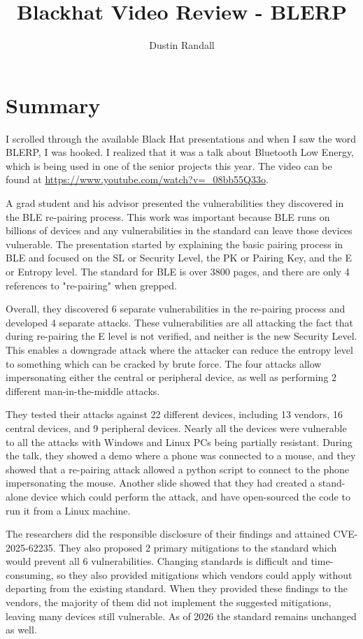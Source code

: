 \documentclass{article}
\begin{document}
\title{Blackhat Video Review - BLERP}
\author{Dustin Randall}
\date{}
\maketitle

\section{Summary}
I scrolled through the available Black Hat presentations and when I saw the word BLERP, I was hooked.
I realized that it was a talk about Bluetooth Low Energy, which is being used in one of the senior projects this year.
The video can be found at \url{https://www.youtube.com/watch?v=_08bb55Q33o}.

A grad student and his advisor presented the vulnerabilities they discovered in the BLE re-pairing process.
This work was important because BLE runs on billions of devices and any vulnerabilities in the standard can leave those devices vulnerable.
The presentation started by explaining the basic pairing process in BLE and focused on the SL or Security Level, the PK or Pairing Key, and the E or Entropy level.
The standard for BLE is over 3800 pages, and there are only 4 references to "re-pairing" when grepped.

Overall, they discovered 6 separate vulnerabilities in the re-pairing process and developed 4 separate attacks.
These vulnerabilities are all attacking the fact that during re-pairing the E level is not verified, and neither is the new Security Level.
This enables a downgrade attack where the attacker can reduce the entropy level to something which can be cracked by brute force.
The four attacks allow impersonating either the central or peripheral device, as well as performing 2 different man-in-the-middle attacks.

They tested their attacks against 22 different devices, including 13 vendors, 16 central devices, and 9 peripheral devices.
Nearly all the devices were vulnerable to all the attacks with Windows and Linux PCs being partially resistant.
During the talk, they showed a demo where a phone was connected to a mouse, and they showed that a re-pairing attack allowed a python script to connect to the phone impersonating the mouse.
Another slide showed that they had created a stand-alone device which could perform the attack, and have open-sourced the code to run it from a Linux machine.

The researchers did the responsible disclosure of their findings and attained CVE-2025-62235.
They also proposed 2 primary mitigations to the standard which would prevent all 6 vulnerabilities.
Changing standards is difficult and time-consuming, so they also provided mitigations which vendors could apply without departing from the existing standard.
When they provided these findings to the vendors, the majority of them did not implement the suggested mitigations, leaving many devices still vulnerable.
As of 2026 the standard remains unchanged as well.
\end{document}
